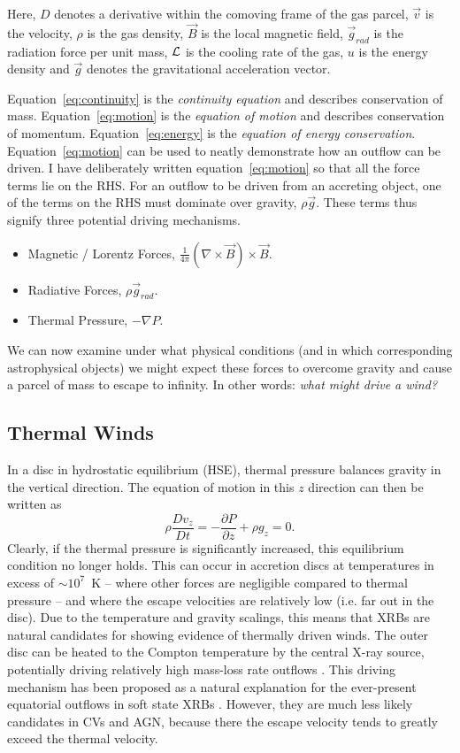 Here, $D$ denotes a derivative within the comoving frame of the gas parcel, $\vec{v}$ is the velocity,
$\rho$ is the gas density, $\vec{B}$ is the local magnetic field, 
$\vec{g}_{rad}$ is the radiation
force per unit mass, $\cal{L}$ is the cooling rate of the gas, $u$ is the energy density 
and $\vec{g}$ denotes the gravitational acceleration vector.

Equation~\ref{eq:continuity} is the {\em continuity equation} and describes conservation of mass. 
Equation~\ref{eq:motion} is the {\em equation of motion} and describes conservation of momentum.
Equation~\ref{eq:energy} is the {\em equation of energy conservation}. 
Equation~\ref{eq:motion} can be used to neatly demonstrate how an outflow can be driven. I have 
deliberately written equation~\ref{eq:motion} 
so that all the force terms lie on the RHS. 
For an outflow to be driven from an accreting object, one of the terms on the RHS must
dominate over gravity, $\rho \vec{g}$. These terms thus signify three potential
driving mechanisms.

\begin{itemize}
	\item Magnetic / Lorentz Forces, $\frac{1}{4 \pi}(\nabla \times \vec{B}) \times \vec{B}$.
	\item Radiative Forces, $\rho \vec{g}_{rad}$.
	\item Thermal Pressure, $-\nabla P$.
\end{itemize}

We can now examine under what physical conditions 
(and in which corresponding astrophysical objects)
we might expect these forces to overcome gravity and 
cause a parcel of mass to escape to infinity.
In other words: {\em what might drive a wind?}

\subsection{Thermal Winds}

In a disc in hydrostatic equilibrium (HSE), 
thermal pressure balances gravity in the vertical direction. 
The equation of motion in this $z$ direction can then be written as 
\begin{equation}
\label{eq:hse}
\rho \frac{Dv_z}{Dt} = -\frac{\partial P}{\partial z} +  \rho g_z = 0.
\end{equation}
Clearly, if the thermal pressure is significantly 
increased, this equilibrium condition no longer holds. 
This can occur in accretion discs at temperatures in excess of $\sim10^7$~K --
where other forces are negligible compared to thermal pressure -- 
and where the escape velocities are relatively low (i.e. far out in the disc).
Due to the temperature and gravity scalings, this means
that XRBs are natural candidates for showing evidence of thermally driven
winds. The outer disc can be heated to the Compton temperature by 
the central X-ray source,
potentially driving relatively high mass-loss rate outflows 
\citep{begelman1983,woods1996}. 
This driving mechanism has been proposed as a natural explanation
for the ever-present equatorial outflows in soft state XRBs \citep{ponti2012}.
However, they are much less likely candidates in CVs and AGN, because there
the escape velocity tends to greatly exceed the thermal velocity.

